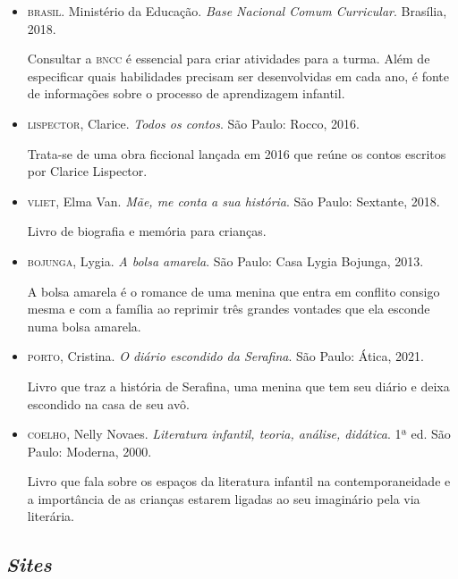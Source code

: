 \documentclass[11pt]{extarticle}
\begin{document}
\begin{itemize}
\item \textsc{brasil}. Ministério da Educação. \textit{Base Nacional Comum Curricular}. Brasília, 2018.

Consultar a \textsc{bncc} é essencial para criar atividades para a turma. Além de especificar quais habilidades precisam ser desenvolvidas em cada ano, é fonte de informações sobre o processo de aprendizagem infantil. 

\item \textsc{lispector}, Clarice. \textit{Todos os contos}. São Paulo: Rocco, 2016.

Trata-se de uma obra ficcional lançada em 2016 que reúne os contos escritos por Clarice Lispector. 
 
\item \textsc{vliet}, Elma Van. \textit{Mãe, me conta a sua história}. São Paulo: Sextante, 2018.

Livro de biografia e memória para crianças.

\item \textsc{bojunga}, Lygia. \textit{A bolsa amarela}. São Paulo: Casa Lygia Bojunga, 2013.

A bolsa amarela é o romance de uma menina que entra em conflito consigo mesma e com a família ao reprimir três grandes vontades que ela esconde numa bolsa amarela.


\item \textsc{porto}, Cristina. \textit{O diário escondido da Serafina}. São Paulo: Ática, 2021.

Livro que traz a história de Serafina, uma menina que tem seu diário e deixa escondido na casa de seu avô.

\item \textsc{coelho}, Nelly Novaes. \textit{Literatura infantil, teoria, análise, didática}. 1ª ed. São Paulo: Moderna, 2000.

Livro que fala sobre os espaços da literatura infantil na contemporaneidade e a importância de as crianças estarem ligadas ao seu imaginário pela via literária.

\end{itemize}

\subsection{\textit{Sites}}
\end{document}
